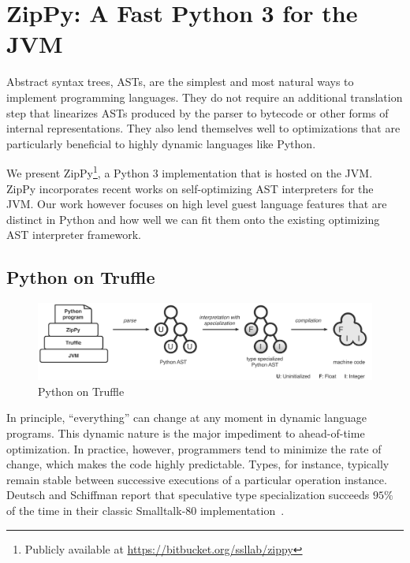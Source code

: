 \chapter{ZipPy: A Fast Python 3 for the JVM}
\label{chp:ch4-zippy}

Abstract syntax trees, ASTs, are the simplest and most natural ways to implement programming languages.
They do not require an additional translation step that linearizes ASTs produced by the parser to bytecode or other forms of internal representations.
They also lend themselves well to optimizations that are particularly beneficial to highly dynamic languages like Python.

We present ZipPy\footnote{Publicly available at \url{https://bitbucket.org/ssllab/zippy}}, a Python 3 implementation that is hosted on the JVM.
ZipPy incorporates recent works on self-optimizing AST interpreters for the JVM.
Our work however focuses on high level guest language features that are distinct in Python and
how well we can fit them onto the existing optimizing AST interpreter framework.

\section{Python on Truffle}

\begin{figure}[t]
\centering
\includegraphics[scale=.6]{figures/ch3-python-on-truffle.pdf}
\caption{Python on Truffle}
\label{fig:python-on-truffle}
\end{figure}

In principle, ``everything'' can change at any moment in dynamic language programs.
This dynamic nature is the major impediment to ahead-of-time optimization.
In practice, however, programmers tend to minimize the rate of change, which makes the code highly predictable.
Types, for instance, typically remain stable between successive executions of a particular operation instance.
Deutsch and Schiffman report that speculative type specialization succeeds $95\%$ of the time in their classic Smalltalk-80 implementation~\cite{Deutsch1984}.

